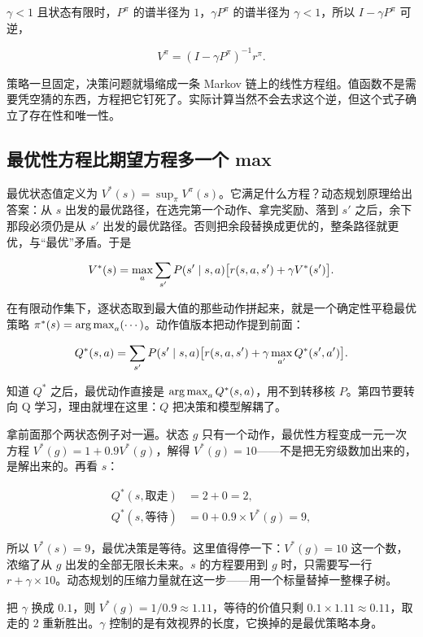 \(\gamma<1\) 且状态有限时，\(P^\pi\) 的谱半径为 \(1\)，\(\gamma P^\pi\) 的谱半径为 \(\gamma<1\)，所以 \(I-\gamma P^\pi\) 可逆，

\[
V^\pi = (I - \gamma P^\pi)^{-1} r^\pi.
\]

策略一旦固定，决策问题就塌缩成一条 Markov 链上的线性方程组。值函数不是需要凭空猜的东西，方程把它钉死了。实际计算当然不会去求这个逆，但这个式子确立了存在性和唯一性。

\subsection{最优性方程比期望方程多一个 max}

最优状态值定义为 \(V^*(s)=\sup_\pi V^\pi(s)\)。它满足什么方程？动态规划原理给出答案：从 \(s\) 出发的最优路径，在选完第一个动作、拿完奖励、落到 \(s'\) 之后，余下那段必须仍是从 \(s'\) 出发的最优路径。否则把余段替换成更优的，整条路径就更优，与``最优''矛盾。于是

\[
V^*(s) = \max_a \sum_{s'} P(s' \mid s, a)
\bigl[ r(s, a, s') + \gamma V^*(s') \bigr].
\]

在有限动作集下，逐状态取到最大值的那些动作拼起来，就是一个确定性平稳最优策略 \(\pi^*(s)=\operatorname*{arg\,max}_a(\cdots)\)。动作值版本把动作提到前面：

\[
Q^*(s, a) = \sum_{s'} P(s' \mid s, a)
\bigl[ r(s, a, s') + \gamma \max_{a'} Q^*(s', a') \bigr].
\]

知道 \(Q^*\) 之后，最优动作直接是 \(\operatorname*{arg\,max}_a Q^*(s,a)\)，用不到转移核 \(P\)。第四节要转向 Q 学习，理由就埋在这里：\(Q\) 把决策和模型解耦了。

拿前面那个两状态例子对一遍。状态 \(g\) 只有一个动作，最优性方程变成一元一次方程 \(V^*(g)=1+0.9V^*(g)\)，解得 \(V^*(g)=10\)——不是把无穷级数加出来的，是解出来的。再看 \(s\)：

\[
\begin{aligned}
Q^*(s, \text{取走}) &= 2 + 0 = 2, \\
Q^*(s, \text{等待}) &= 0 + 0.9 \times V^*(g) = 9,
\end{aligned}
\]

所以 \(V^*(s)=9\)，最优决策是等待。这里值得停一下：\(V^*(g)=10\) 这一个数，浓缩了从 \(g\) 出发的全部无限长未来。\(s\) 的方程要用到 \(g\) 时，只需要写一行 \(r+\gamma\times 10\)。动态规划的压缩力量就在这一步——用一个标量替掉一整棵子树。

把 \(\gamma\) 换成 \(0.1\)，则 \(V^*(g)=1/0.9\approx 1.11\)，等待的价值只剩 \(0.1\times 1.11\approx 0.11\)，取走的 \(2\) 重新胜出。\(\gamma\) 控制的是有效视界的长度，它换掉的是最优策略本身。

